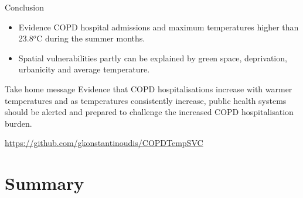 \documentclass{beamer}
\begin{document}
\begin{frame}{Conclusion}
	\begin{itemize}
		\item Evidence COPD hospital admissions and maximum temperatures higher than 23.8$^o$C during the summer months.
		\item Spatial vulnerabilities partly can be explained by green space, deprivation, urbanicity and average temperature.
	\end{itemize}
	
	\begin{block}{Take home message}
		{
			Evidence that COPD hospitalisations increase with warmer temperatures and as temperatures consistently increase, public health systems should be alerted and prepared to challenge the increased COPD hospitalisation burden. 
		}
	\end{block}
	
	\url{https://github.com/gkonstantinoudis/COPDTempSVC}
	
\end{frame}

\section{Summary}

\end{document}
